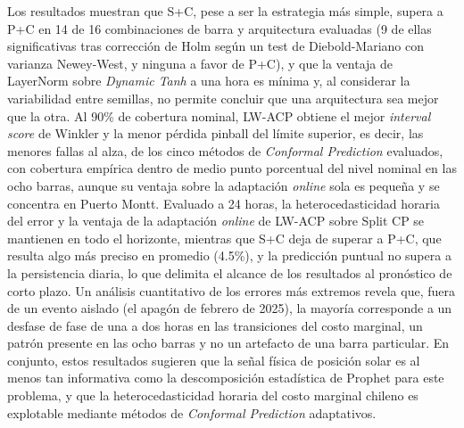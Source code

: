\documentclass{umemoria}
\begin{document}
\begin{resumen}
Los resultados muestran que S+C, pese a ser la estrategia más simple, supera a P+C en 14 de 16 combinaciones de barra y arquitectura evaluadas (9 de ellas significativas tras corrección de Holm según un test de Diebold-Mariano con varianza Newey-West, y ninguna a favor de P+C), y que la ventaja de LayerNorm sobre \textit{Dynamic Tanh} a una hora es mínima y, al considerar la variabilidad entre semillas, no permite concluir que una arquitectura sea mejor que la otra. Al 90\% de cobertura nominal, LW-ACP obtiene el mejor \textit{interval score} de Winkler y la menor pérdida pinball del límite superior, es decir, las menores fallas al alza, de los cinco métodos de \textit{Conformal Prediction} evaluados, con cobertura empírica dentro de medio punto porcentual del nivel nominal en las ocho barras, aunque su ventaja sobre la adaptación \textit{online} sola es pequeña y se concentra en Puerto Montt. Evaluado a 24 horas, la heterocedasticidad horaria del error y la ventaja de la adaptación \textit{online} de LW-ACP sobre Split CP se mantienen en todo el horizonte, mientras que S+C deja de superar a P+C, que resulta algo más preciso en promedio (4.5\%), y la predicción puntual no supera a la persistencia diaria, lo que delimita el alcance de los resultados al pronóstico de corto plazo. Un análisis cuantitativo de los errores más extremos revela que, fuera de un evento aislado (el apagón de febrero de 2025), la mayoría corresponde a un desfase de fase de una a dos horas en las transiciones del costo marginal, un patrón presente en las ocho barras y no un artefacto de una barra particular. En conjunto, estos resultados sugieren que la señal física de posición solar es al menos tan informativa como la descomposición estadística de Prophet para este problema, y que la heterocedasticidad horaria del costo marginal chileno es explotable mediante métodos de \textit{Conformal Prediction} adaptativos.
\end{resumen}

\clearpage
\end{document}
